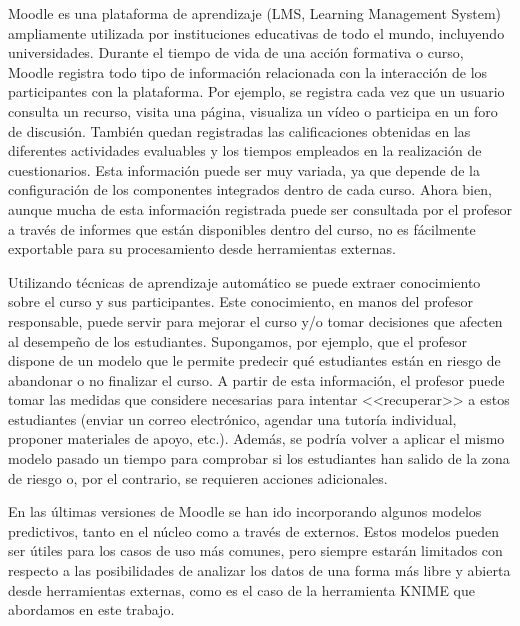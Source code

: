
Moodle es una plataforma de aprendizaje (LMS, Learning Management System) ampliamente utilizada por instituciones educativas de todo el mundo, incluyendo universidades. 
Durante el tiempo de vida de una acción formativa o curso, Moodle registra todo tipo de información relacionada con la interacción de los participantes con la plataforma.  Por ejemplo, 
 se registra cada vez que un usuario consulta un recurso, visita una página, visualiza un vídeo o participa en un foro de discusión. También quedan registradas las 
 calificaciones obtenidas en las diferentes actividades evaluables y los tiempos empleados en la realización de cuestionarios. Esta información puede ser muy variada, 
 ya que depende de la configuración de los componentes integrados dentro de cada curso. Ahora bien, aunque mucha de esta información registrada puede ser consultada por el profesor a través de informes que están disponibles dentro del curso, no es fácilmente exportable 
 para su procesamiento desde herramientas externas. 
\

Utilizando técnicas de aprendizaje automático se puede extraer conocimiento sobre el curso y sus participantes. Este conocimiento, en manos del profesor responsable, puede servir para mejorar el curso 
y/o tomar decisiones que afecten al desempeño de los estudiantes. Supongamos, por ejemplo, que el profesor dispone de un modelo que le permite predecir qué estudiantes están en riesgo de abandonar 
o no finalizar el curso. A partir de esta información, el profesor puede tomar las medidas que considere necesarias para intentar <<recuperar>> a estos 
estudiantes (enviar un correo electrónico, agendar una tutoría individual, proponer materiales de apoyo, etc.). Además, se podría volver a aplicar el mismo modelo pasado un tiempo para comprobar si los
 estudiantes han salido de la zona de riesgo o, por el contrario, se requieren acciones adicionales. 
\

En las últimas versiones de Moodle se han ido incorporando algunos modelos predictivos, tanto en el núcleo como a través de  externos. Estos modelos pueden ser útiles para los casos de uso más comunes,
pero siempre estarán limitados con respecto a las posibilidades de analizar los datos de una forma más libre y abierta desde herramientas externas, como es el caso de la herramienta KNIME que abordamos en este trabajo.
\

